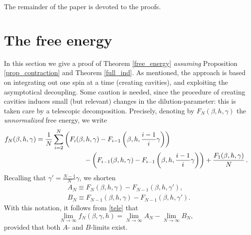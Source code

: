 \documentclass[a4paper,12pt,oneside,reqno]{amsart}
\numberwithin{equation}{section}
\begin{document}
The remainder of the paper is devoted to the  proofs. 

\section{The free energy} \label{free_energy_proof}
In this section we give a  proof of Theorem \ref{free_energy} {\it assuming} Proposition \ref{prop_contraction} and Theorem \ref{full_ind}. As mentioned, the approach is based on integrating out one spin at a time (creating cavities), and exploiting the asymptotical decoupling. Some caution is needed, since the procedure of creating cavities induces small (but relevant) changes in the dilution-parameter: this is taken care by a telescopic decomposition. Precisely, denoting by $F_N({\beta}, h, \gamma)$ the {\it unnormalized} free energy, we write
\begin{equation} \label{tele} \begin{aligned}
f_N({\beta}, h, \gamma) & = \frac{1}{N} \sum_{i=2}^N \left( F_i({\beta}, h, \gamma)  - F_{i-1}\left({\beta}, h, \frac{i-1}{i} \gamma \right) \right) \\
& \hspace{2.5cm} - \left( F_{i-1}({\beta}, h, \gamma) -  F_{i-1}\left({\beta}, h, \frac{i-1}{i} \gamma \right)  \right) + \frac{F_1({\beta}, h, \gamma)}{N}\,.
\end{aligned} \end{equation}
Recalling that $\gamma' = \frac{N-1}{N} \gamma$, we shorten
\begin{equation} \begin{aligned}
& A_N {\equiv} F_N({\beta}, h, \gamma)  - F_{N-1}\left({\beta}, h, \gamma' \right), \\
& B_N {\equiv} F_{N-1}({\beta}, h, \gamma)  - F_{N-1}\left({\beta}, h, \gamma' \right).
\end{aligned} \end{equation}
With this notation, it follows from \eqref{tele} that
\begin{equation}
\lim_{N\to \infty} f_N({\beta}, \gamma, h) = \lim_{N\to \infty} A_N - \lim_{N \to \infty} B_N,
\end{equation} 
provided that both $A$- and $B$-limits exist. 
\end{document}
